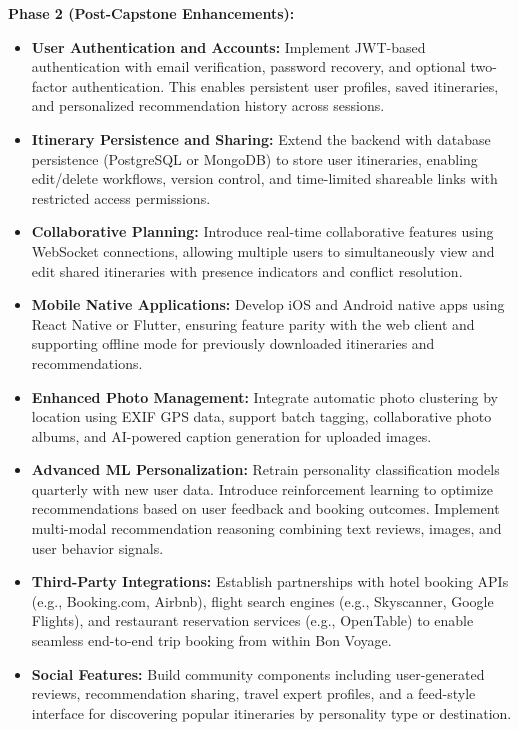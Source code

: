 \documentclass[12pt,oneside,openany]{report}
\begin{document}
\textbf{Phase 2 (Post-Capstone Enhancements):}
\begin{itemize}
\item \textbf{User Authentication and Accounts:} Implement JWT-based authentication with email verification, password recovery, and optional two-factor authentication. This enables persistent user profiles, saved itineraries, and personalized recommendation history across sessions.

\item \textbf{Itinerary Persistence and Sharing:} Extend the backend with database persistence (PostgreSQL or MongoDB) to store user itineraries, enabling edit/delete workflows, version control, and time-limited shareable links with restricted access permissions.

\item \textbf{Collaborative Planning:} Introduce real-time collaborative features using WebSocket connections, allowing multiple users to simultaneously view and edit shared itineraries with presence indicators and conflict resolution.

\item \textbf{Mobile Native Applications:} Develop iOS and Android native apps using React Native or Flutter, ensuring feature parity with the web client and supporting offline mode for previously downloaded itineraries and recommendations.

\item \textbf{Enhanced Photo Management:} Integrate automatic photo clustering by location using EXIF GPS data, support batch tagging, collaborative photo albums, and AI-powered caption generation for uploaded images.

\item \textbf{Advanced ML Personalization:} Retrain personality classification models quarterly with new user data. Introduce reinforcement learning to optimize recommendations based on user feedback and booking outcomes. Implement multi-modal recommendation reasoning combining text reviews, images, and user behavior signals.

\item \textbf{Third-Party Integrations:} Establish partnerships with hotel booking APIs (e.g., Booking.com, Airbnb), flight search engines (e.g., Skyscanner, Google Flights), and restaurant reservation services (e.g., OpenTable) to enable seamless end-to-end trip booking from within Bon Voyage.

\item \textbf{Social Features:} Build community components including user-generated reviews, recommendation sharing, travel expert profiles, and a feed-style interface for discovering popular itineraries by personality type or destination.
\end{itemize}
\end{document}
